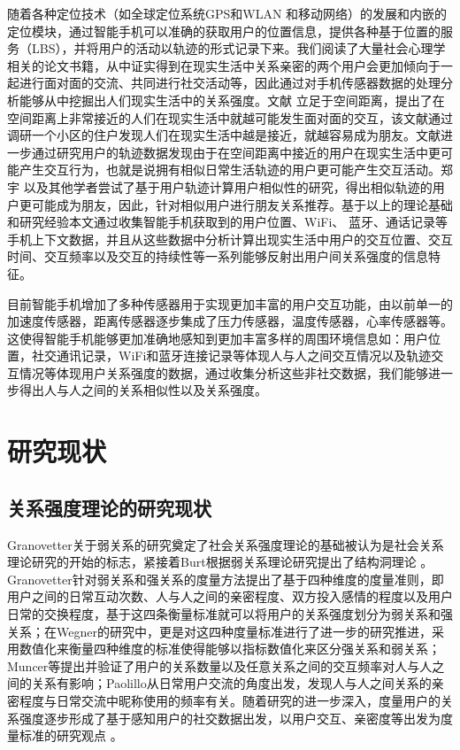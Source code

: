 \par 随着各种定位技术（如全球定位系统GPS和WLAN 和移动网络）的发展和内嵌的定位模块，通过智能手机可以准确的获取用户的位置信息，提供各种基于位置的服务（LBS），并将用户的活动以轨迹的形式记录下来。我们阅读了大量社会心理学相关的论文书籍，从中证实得到在现实生活中关系亲密的两个用户会更加倾向于一起进行面对面的交流、共同进行社交活动等，因此通过对手机传感器数据的处理分析能够从中挖掘出人们现实生活中的关系强度。文献\cite{zillmann2013selective} 立足于空间距离，提出了在空间距离上非常接近的人们在现实生活中就越可能发生面对面的交互，该文献通过调研一个小区的住户发现人们在现实生活中越是接近，就越容易成为朋友。文献\cite{zajonc1968attitudinal,zillmann2000mood}进一步通过研究用户的轨迹数据发现由于在空间距离中接近的用户在现实生活中更可能产生交互行为，也就是说拥有相似日常生活轨迹的用户更可能产生交互活动。郑宇 以及其他学者尝试了基于用户轨迹计算用户相似性的研究，得出相似轨迹的用户更可能成为朋友，因此，针对相似用户进行朋友关系推荐。基于以上的理论基础和研究经验本文通过收集智能手机获取到的用户位置、WiFi、 蓝牙、通话记录等手机上下文数据，并且从这些数据中分析计算出现实生活中用户的交互位置、交互时间、交互频率以及交互的持续性等一系列能够反射出用户间关系强度的信息特征。

\par 目前智能手机增加了多种传感器用于实现更加丰富的用户交互功能，由以前单一的加速度传感器，距离传感器逐步集成了压力传感器，温度传感器，心率传感器等。这使得智能手机能够更加准确地感知到更加丰富多样的周围环境信息如：用户位置，社交通讯记录，WiFi和蓝牙连接记录等体现人与人之间交互情况以及轨迹交互情况等体现用户关系强度的数据，通过收集分析这些非社交数据，我们能够进一步得出人与人之间的关系相似性以及关系强度。


\section{研究现状}
\subsection{关系强度理论的研究现状}
Granovetter关于弱关系的研究奠定了社会关系强度理论的基础被认为是社会关系理论研究的开始的标志，紧接着Burt根据弱关系理论研究提出了结构洞理论
。Granovetter针对弱关系和强关系的度量方法提出了基于四种维度的度量准则，即用户之间的日常互动次数、人与人之间的亲密程度、双方投入感情的程度以及用户日常的交换程度，基于这四条衡量标准就可以将用户的关系强度划分为弱关系和强关系；在Wegner的研究中，更是对这四种度量标准进行了进一步的研究推进，采用数值化来衡量四种维度的标准使得能够以指标数值化来区分强关系和弱关系；Muncer等提出并验证了用户的关系数量以及任意关系之间的交互频率对人与人之间的关系有影响；Paolillo从日常用户交流的角度出发，发现人与人之间关系的亲密程度与日常交流中昵称使用的频率有关。随着研究的进一步深入，度量用户的关系强度逐步形成了基于感知用户的社交数据出发，以用户交互、亲密度等出发为度量标准的研究观点
。
